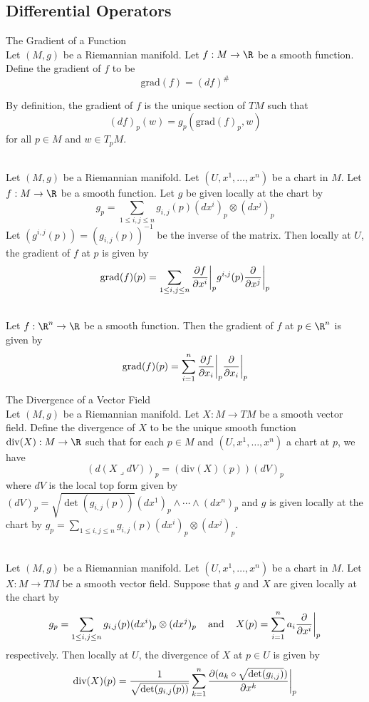 \documentclass[a4paper]{article}
\begin{document}
\subsection{Differential Operators}
\begin{defn}{The Gradient of a Function}{}\\
Let $(M,g)$ be a Riemannian manifold. Let $f:M\to\R$ be a smooth function. Define the gradient of $f$ to be $$\text{grad}(f)=(df)^\#$$
\end{defn}

By definition, the gradient of $f$ is the unique section of $TM$ such that $$(df)_p(w)=g_p(\text{grad}(f)_p,w)$$ for all $p\in M$ and $w\in T_pM$. 

\begin{prp}{}{}\\
Let $(M,g)$ be a Riemannian manifold. Let $(U,x^1,\dots,x^n)$ be a chart in $M$. Let $f:M\to\R$ be a smooth function. Let $g$ be given locally at the chart by $$g_p=\sum_{1\leq i,j\leq n}g_{i,j}(p)(dx^i)_p\otimes(dx^j)_p$$ Let $(g^{i,j}(p))=(g_{i,j}(p))^{-1}$ be the inverse of the matrix. Then locally at $U$, the gradient of $f$ at $p$ is given by $$\text{grad}(f)(p)=\sum_{1\leq i,j\leq n}\frac{\partial f}{\partial x^i}\bigg{|}_pg^{i,j}(p)\frac{\partial}{\partial x^j}\bigg{|}_p$$
\end{prp}

\begin{eg}{}{}\\
Let $f:\R^n\to\R$ be a smooth function. Then the gradient of $f$ at $p\in\R^n$ is given by $$\text{grad}(f)(p)=\sum_{i=1}^n\frac{\partial f}{\partial x_i}\bigg{|}_p\frac{\partial}{\partial x_i}\bigg{|}_p$$
\end{eg}

\begin{defn}{The Divergence of a Vector Field}{}\\
Let $(M,g)$ be a Riemannian manifold. Let $X:M\to TM$ be a smooth vector field. Define the divergence of $X$ to be the unique smooth function $\text{div}(X):M\to\R$ such that for each $p\in M$ and $(U,x^1,\dots,x^n)$ a chart at $p$, we have $$(d(X\lrcorner dV))_p=(\text{div}(X)(p))(dV)_p$$ where $dV$ is the local top form given by $(dV)_p=\sqrt{\det(g_{i,j}(p))}(dx^1)_p\wedge\cdots\wedge(dx^n)_p$ and $g$ is given locally at the chart by $g_p=\sum_{1\leq i,j\leq n}g_{i,j}(p)(dx^i)_p\otimes(dx^j)_p$. 
\end{defn}

\begin{prp}{}{}\\
Let $(M,g)$ be a Riemannian manifold. Let $(U,x^1,\dots,x^n)$ be a chart in $M$. Let $X:M\to TM$ be a smooth vector field. Suppose that $g$ and $X$ are given locally at the chart by $$g_p=\sum_{1\leq i,j\leq n}g_{i,j}(p)(dx^i)_p\otimes(dx^j)_p\;\;\;\text{ and }\;\;\;X(p)=\sum_{i=1}^na_i\frac{\partial}{\partial x^i}\bigg{|}_p$$ respectively. Then locally at $U$, the divergence of $X$ at $p\in U$ is given by $$\text{div}(X)(p)=\frac{1}{\sqrt{\det(g_{i,j}(p))}}\sum_{k=1}^n\frac{\partial(a_k\circ\sqrt{\det(g_{i,j})})}{\partial x^k}\bigg{|}_p$$
\end{prp}
\end{document}
